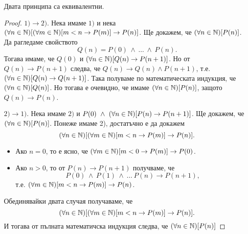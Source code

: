\begin{prop}
  Двата принципа са еквивалентни.
\end{prop}
\begin{proof}
  $1)\to 2)$.
  Нека имаме $1)$ и нека $(\forall n\in\mathbb{N})[(\forall m \in\mathbb{N})[m < n \rightarrow P(m)]\rightarrow P(n)]$.
  Ще докажем, че $(\forall n \in \mathbb{N})[P(n)]$.
  Да рагледаме свойството \[Q(n) = P(0)\ \wedge\ \dots\ \wedge\ P(n).\]
  Тогава имаме, че $Q(0)$ и $(\forall n\in\mathbb{N})[Q(n) \rightarrow P(n+1)]$.
  Но от $Q(n) \rightarrow P(n+1)$ следва, че $Q(n) \rightarrow Q(n) \wedge P(n+1)$, т.е.
  $(\forall n\in\mathbb{N})[Q(n)\rightarrow Q(n+1)]$.
  Така полуваме по математическата индукция, че $(\forall n\in\mathbb{N})[Q(n)]$.
  Но тогава е очевидно, че имаме $(\forall n\in\mathbb{N})[P(n)]$,
  защото $Q(n) \rightarrow P(n)$.

  $2) \to 1)$.
  Нека имаме $2)$ и $P(0)\ \wedge\ (\forall n\in\mathbb{N})[P(n)\rightarrow P(n+1)]$.
  Ще докажем, че $(\forall n \in \mathbb{N})[P(n)]$.
  Понеже имаме 2), достатъчно е да докажем
  \[(\forall n\in\mathbb{N})[(\forall m \in\mathbb{N})[m < n \rightarrow P(m)]\rightarrow P(n)].\]
  \begin{itemize}
  \item 
    Ако $n = 0$, то е ясно, че
    $(\forall m \in\mathbb{N})[m < 0 \rightarrow P(m)]\rightarrow P(0)$.
  \item
    Ако $n > 0$, то от $P(n)\rightarrow P(n+1)$ получваме, че 
    \[P(0)\ \wedge\ P(1)\ \wedge\ \dots\ P(n) \to P(n+1),\] т.е.
    $(\forall m \in\mathbb{N})[m < n \rightarrow P(m)]\rightarrow P(n)$.
  \end{itemize}
  Обединявайки двата случая получаваме, че 
  \[(\forall n\in\mathbb{N})[(\forall m \in\mathbb{N})[m < n \rightarrow P(m)]\rightarrow P(n)].\]
  И тогава от пълната математичска индукция следва, че $(\forall n \in \mathbb{N})[P(n)]$
\end{proof}

    
